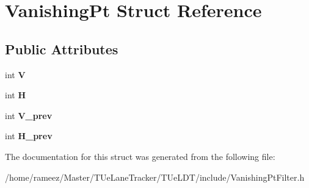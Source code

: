\hypertarget{structVanishingPt}{\section{Vanishing\-Pt Struct Reference}
\label{structVanishingPt}
}
\subsection*{Public Attributes}
\begin{DoxyCompactItemize}
\item 
\hypertarget{structVanishingPt_a6d9909ba6a33313168a95a84c9f8e944}{int {\bfseries V}}\label{structVanishingPt_a6d9909ba6a33313168a95a84c9f8e944}

\item 
\hypertarget{structVanishingPt_abe4867620d0ccf017a4cdab7d7b8d9c1}{int {\bfseries H}}\label{structVanishingPt_abe4867620d0ccf017a4cdab7d7b8d9c1}

\item 
\hypertarget{structVanishingPt_ad996aee9893bacc7ca79ce8da5c7ef23}{int {\bfseries V\-\_\-prev}}\label{structVanishingPt_ad996aee9893bacc7ca79ce8da5c7ef23}

\item 
\hypertarget{structVanishingPt_a83e330bc4a84c5a8cba78838d2eb6bd3}{int {\bfseries H\-\_\-prev}}\label{structVanishingPt_a83e330bc4a84c5a8cba78838d2eb6bd3}

\end{DoxyCompactItemize}


The documentation for this struct was generated from the following file\-:\begin{DoxyCompactItemize}
\item 
/home/rameez/\-Master/\-T\-Ue\-Lane\-Tracker/\-T\-Ue\-L\-D\-T/include/Vanishing\-Pt\-Filter.\-h\end{DoxyCompactItemize}
